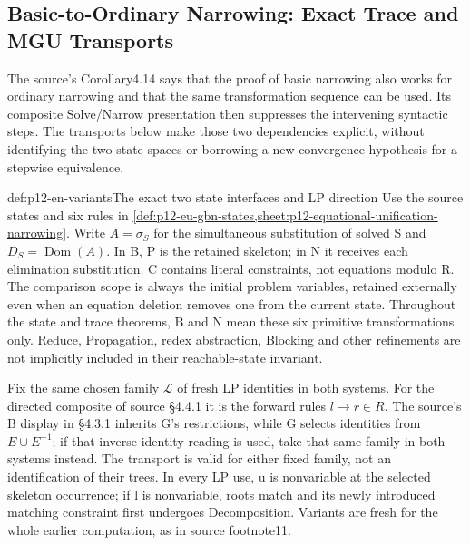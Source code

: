 \subsection{Basic-to-Ordinary Narrowing: Exact Trace and MGU Transports}
\label{sec:p12-equational-narrowing-transport}

The source's Corollary4.14 says that the proof of basic narrowing also
works for ordinary narrowing and that the same transformation sequence
can be used. Its composite Solve/Narrow presentation then suppresses
the intervening syntactic steps. The transports below make those two
dependencies explicit, without identifying the two state spaces or
borrowing a new convergence hypothesis for a stepwise equivalence.
\cite[\S\S4.3.1--4.4.1, pp.~496--499]{BaaderSnyder2001}

\begin{hbdefinition}{def:p12-en-variants}{The exact two state interfaces and LP direction}
Use the source states and six rules in
\cref{def:p12-eu-gbn-states,sheet:p12-equational-unification-narrowing}.
Write \(A=\sigma_S\) for the simultaneous substitution of solved S
and \(D_S=\operatorname{Dom}(A)\). In B, P is the retained skeleton;
in N it receives each elimination substitution. C contains literal
constraints, not equations modulo R. The comparison scope is always
the initial problem variables, retained externally even when an
equation deletion removes one from the current state.
Throughout the state and trace theorems, B and N mean these six
primitive transformations only. Reduce, Propagation, redex abstraction,
Blocking and other refinements are not implicitly included in their
reachable-state invariant.

Fix the same chosen family \(\mathcal L\) of fresh LP identities
in both systems. For the directed composite of source \S4.4.1 it is
the forward rules \(l\to r\in R\). The source's B display in
\S4.3.1 inherits G's restrictions, while G selects identities from
\(E\cup E^{-1}\); if that inverse-identity reading is used,
take that same family in both systems instead. The transport is
valid for either fixed family, not an identification of their trees.
In every LP use, u is nonvariable at the selected skeleton occurrence;
if l is nonvariable, roots match and its newly introduced matching
constraint first undergoes Decomposition. Variants are fresh for the
whole earlier computation, as in source footnote11.
\cite[\S4.1.1, pp.~488--489; \S4.3.1, p.~496]{BaaderSnyder2001}
\end{hbdefinition}

